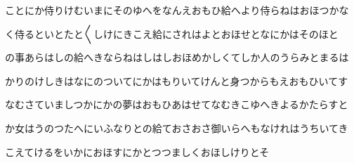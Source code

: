 \documentclass[a4paper,11pt,landscape]{ltjtarticle}
\begin{document}
\par\medskip
ことにか侍りけむいまにそのゆへをなんえおもひ給へより侍らねはおほつかな
\par\medskip
く侍るといとたと〱しけにきこえ給にされはよとおほせとなにかはそのほと
\par\medskip
の事あらはしの給へきならねはしはしおほめかしくてしか人のうらみとまるは
\par\medskip
かりのけしきはなにのついてにかはもりいてけんと身つからもえおもひいてす
\par\medskip
なむさていましつかにかの夢はおもひあはせてなむきこゆへきよるかたらすと
\par\medskip
か女はうのつたへにいふなりとの給ておさおさ御いらへもなけれはうちいてき
\par\medskip
こえてけるをいかにおほすにかとつつましくおほしけりとそ
\par\medskip
\end{document}
